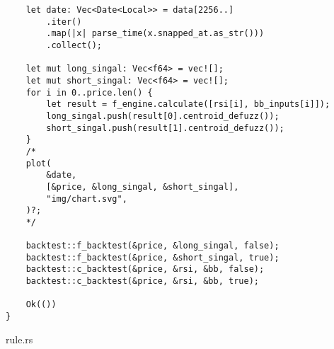 \begin{verbatim}
    let date: Vec<Date<Local>> = data[2256..]
        .iter()
        .map(|x| parse_time(x.snapped_at.as_str()))
        .collect();

    let mut long_singal: Vec<f64> = vec![];
    let mut short_singal: Vec<f64> = vec![];
    for i in 0..price.len() {
        let result = f_engine.calculate([rsi[i], bb_inputs[i]]);
        long_singal.push(result[0].centroid_defuzz());
        short_singal.push(result[1].centroid_defuzz());
    }
    /*
    plot(
        &date,
        [&price, &long_singal, &short_singal],
        "img/chart.svg",
    )?;
    */

    backtest::f_backtest(&price, &long_singal, false);
    backtest::f_backtest(&price, &short_singal, true);
    backtest::c_backtest(&price, &rsi, &bb, false);
    backtest::c_backtest(&price, &rsi, &bb, true);

    Ok(())
}
\end{verbatim}
\noindent rule.rs
